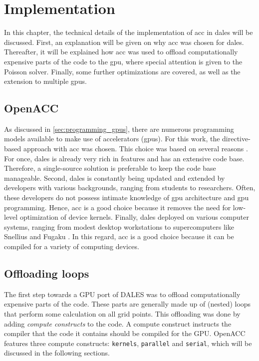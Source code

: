 \chapter{Implementation}
In this chapter, the technical details of the implementation of \acrshort{acc} in \acrshort{dales} will be discussed. First, an explanation will be given on why \acrshort{acc} was chosen for \acrshort{dales}. Thereafter, it will be explained how \acrshort{acc} was used to offload computationally expensive parts of the code to the \acrshort{gpu}, where special attention is given to the Poisson solver. Finally, some further optimizations are covered, as well as the extension to multiple \acrshort{gpu}s.

\section{OpenACC}
As discussed in \autoref{sec:programming_gpus}, there are numerous programming models available to make use of accelerators (\acrshort{gpu}s). For this work, the directive-based approach with \acrshort{acc} was chosen. This choice was based on several reasons . For once, \acrshort{dales} is already very rich in features and has an extensive code base. Therefore, a single-source solution is preferable to keep the code base manageable. Second, \acrshort{dales} is constantly being updated and extended by developers with various backgrounds, ranging from students to researchers. Often, these developers do not possess intimate knowledge of \acrshort{gpu} architecture and \acrshort{gpu} programming. Hence, \acrshort{acc} is a good choice because it removes the need for low-level optimization of device kernels. Finally, \acrshort{dales} deployed on various computer systems, ranging from modest desktop workstations to supercomputers like Snellius and Fugaku \citep{janssonCloudBotanyShallow2023}. In this regard, \acrshort{acc} is a good choice because it can be compiled for a variety of computing devices.

\section{Offloading loops}
The first step towards a GPU port of DALES was to offload computationally expensive parts of the code. These parts are generally made up of (nested) loops that perform some calculation on all grid points. This offloading was done by adding \emph{compute constructs} to the code. A compute construct instructs the compiler that the code it contains should be compiled for the GPU. OpenACC features three compute constructs: \texttt{kernels}, \texttt{parallel} and \texttt{serial}, which will be discussed in the following sections. 

